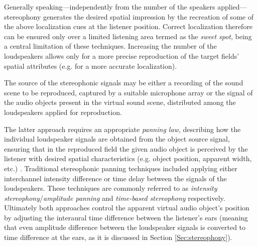 Generally speaking---independently from the number of the speakers applied---stereophony generates the desired spatial impression by the recreation of some of the above localization cues at the listener position.
Correct localization therefore can be ensured only over a limited listening area termed as the \emph{sweet spot}, being a central limitation of these techniques.
Increasing the number of the loudspeakers allows only for a more precise reproduction of the target fields' spatial attributes (e.g. for a more accurate localization).

The source of the stereophonic signals may be either a recording of the sound scene to be reproduced, captured by a suitable microphone array \cite{lipshitz1985stereo, williams1999microphone, wittek2017development} or the signal of the audio objects present in the virtual sound scene, distributed among the loudspeakers applied for reproduction.

The latter approach requires an appropriate \emph{panning law}, describing how the individual loudspeaker signals are obtained from the object source signal, ensuring that in the reproduced field the given audio object is perceived by the listener with desired spatial characteristics (e.g. object position, apparent width, etc.) \cite{Pulkki2001a, Pulkki2001b}.
Traditional stereophonic panning techniques included applying either interchannel intensity difference or time delay between the signals of the loudspeakers.
These techniques are commonly referred to as \emph{intensity stereophony}/\emph{amplitude panning} and \emph{time-based stereophony} respectively.
Ultimately both approaches control the apparent virtual audio object's position by adjusting the interaural time difference between the listener's ears (meaning that even amplitude difference between the loudspeaker signals is converted to time difference at the ears, as it is discussed in Section \ref{Sec:stereophony}).

